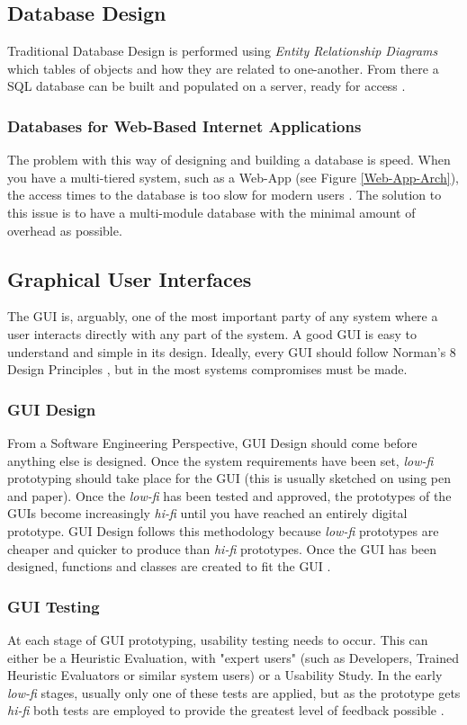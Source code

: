 \documentclass[final]{cmpreport}
\begin{document}
	\subsection{Database Design} \label{Database}
	Traditional Database Design is performed using \emph{Entity Relationship Diagrams} which tables of objects and how they are related to one-another. From there a SQL database can be built and populated on a server, ready for access \citep{DatabaseDesign}. 
	
	\subsubsection{Databases for Web-Based Internet Applications}
	The problem with this way of designing and building a database is speed. When you have a multi-tiered system, such as a Web-App (see Figure \ref{Web-App-Arch}), the access times to the database is too slow for modern users \citep{WebAppDatabase}. The solution to this issue is to have a multi-module database with the minimal amount of overhead as possible. 

	\subsection{Graphical User Interfaces} \label{GUIs}
	The GUI is, arguably, one of the most important party of any system where a user interacts directly with any part of the system. A good GUI is easy to understand and simple in its design. Ideally, every GUI should follow Norman's 8 Design Principles \citep{Norman}, but in the most systems compromises must be made. 
	
	\subsubsection{GUI Design}
	From a Software Engineering Perspective, GUI Design should come before anything else is designed. Once the system requirements have been set, \emph{low-fi} prototyping should take place for the GUI (this is usually sketched on using pen and paper). Once the \emph{low-fi} has been tested and approved, the prototypes of the GUIs become increasingly \emph{hi-fi} until you have reached an entirely digital prototype. GUI Design follows this methodology because \emph{low-fi} prototypes are cheaper and quicker to produce than \emph{hi-fi} prototypes. Once the GUI has been designed, functions and classes are created to fit the GUI \citep{GUIDesign}. 
	
	\subsubsection{GUI Testing}
	At each stage of GUI prototyping, usability testing needs to occur. This can either be a Heuristic Evaluation, with "expert users" (such as Developers, Trained Heuristic Evaluators or similar system users) or a Usability Study. In the early \emph{low-fi} stages, usually only one of these tests are applied, but as the prototype gets \emph{hi-fi} both tests are employed to provide the greatest level of feedback possible \citep{GUIDesign}.
	
\end{document}
